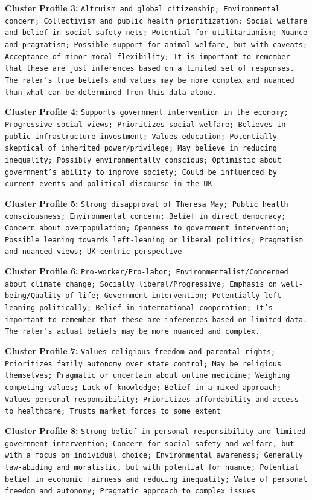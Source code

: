 \documentclass[11pt]{article}
\begin{document}
\textbf{Cluster Profile 3:} \texttt{Altruism and global citizenship; Environmental concern; Collectivism and public health prioritization; Social welfare and belief in social safety nets; Potential for utilitarianism; Nuance and pragmatism; Possible support for animal welfare, but with caveats; Acceptance of minor moral flexibility; It is important to remember that these are just inferences based on a limited set of responses. The rater's true beliefs and values may be more complex and nuanced than what can be determined from this data alone.}

\textbf{Cluster Profile 4:} \texttt{Supports government intervention in the economy; Progressive social views; Prioritizes social welfare; Believes in public infrastructure investment; Values education; Potentially skeptical of inherited power/privilege; May believe in reducing inequality; Possibly environmentally conscious; Optimistic about government's ability to improve society; Could be influenced by current events and political discourse in the UK}

\textbf{Cluster Profile 5:} \texttt{Strong disapproval of Theresa May; Public health consciousness; Environmental concern; Belief in direct democracy; Concern about overpopulation; Openness to government intervention; Possible leaning towards left-leaning or liberal politics; Pragmatism and nuanced views; UK-centric perspective}

\textbf{Cluster Profile 6:} \texttt{Pro-worker/Pro-labor; Environmentalist/Concerned about climate change; Socially liberal/Progressive; Emphasis on well-being/Quality of life; Government intervention; Potentially left-leaning politically; Belief in international cooperation; It's important to remember that these are inferences based on limited data.  The rater's actual beliefs may be more nuanced and complex.}

\textbf{Cluster Profile 7:} \texttt{Values religious freedom and parental rights; Prioritizes family autonomy over state control; May be religious themselves; Pragmatic or uncertain about online medicine; Weighing competing values; Lack of knowledge; Belief in a mixed approach; Values personal responsibility; Prioritizes affordability and access to healthcare; Trusts market forces to some extent}

\textbf{Cluster Profile 8:} \texttt{Strong belief in personal responsibility and limited government intervention; Concern for social safety and welfare, but with a focus on individual choice; Environmental awareness; Generally law-abiding and moralistic, but with potential for nuance; Potential belief in economic fairness and reducing inequality; Value of personal freedom and autonomy; Pragmatic approach to complex issues}
\end{document}
